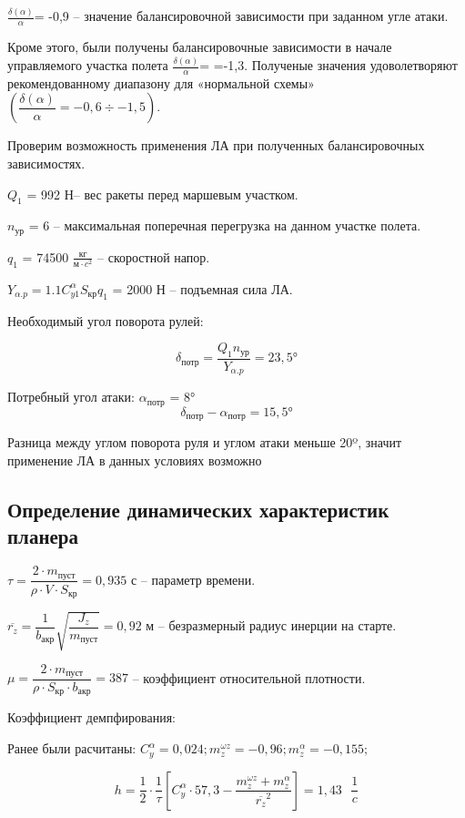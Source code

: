 $ \frac{\delta(\alpha)}{\alpha} $= -0,9 – значение балансировочной зависимости при заданном угле атаки.

Кроме этого, были получены балансировочные зависимости в начале управляемого участка полета  $\frac{\delta(\alpha)}{\alpha}$= =-1,3. Полученые значения удоволетворяют рекомендованному диапазону для «нормальной схемы» $\left( \dfrac{\delta(\alpha)}{\alpha}=-0,6 \div -1,5 \right) $.

Проверим возможность применения ЛА при полученных балансировочных зависимостях.

$Q_1 $ = 992 Н– вес ракеты перед маршевым участком.

$n_\text{ур}$ = 6 – максимальная поперечная перегрузка на данном участке полета.

$q_1$ = 74500  $\frac{\text{кг}}{м \cdot c^2} $ – скоростной напор.

$Y_{\alpha.p}=1.1 C_{y1}^\alpha S_\text{кр} q_1 $ = 2000 Н – подъемная сила ЛА.

Необходимый угол поворота рулей:

$$\delta_\text{потр} = \dfrac{Q_1 n_\text{ур}}{Y_{\alpha.p}} = 23,5\text{°}$$

Потребный угол атаки: $\alpha_\text{потр} $ = 8°
$$\delta_\text{потр}-\alpha_\text{потр} = 15,5\text{°}$$

Разница между углом поворота руля и углом атаки меньше 20º, значит применение ЛА в данных условиях возможно

\clearpage
\subsection{Определение динамических характеристик планера}

$\tau= \dfrac {2 \cdot m_\text{пуст}} {\rho \cdot V \cdot S_\text{кр} }  = 0,935$ с – параметр времени.

$\overline{r_z} = \dfrac{1}{b_\text{акр}}  \sqrt{\dfrac{J_z} {m_\text{пуст}}}  = 0,92 $  м – безразмерный радиус инерции на старте.

$\mu= \dfrac{ 2 \cdot m_\text{пуст}} {\rho \cdot S_\text{кр} \cdot b_\text{акр} }  = 387$ – коэффициент относительной плотности.

Коэффициент демпфирования:

Ранее были расчитаны: $C_y^\alpha=0,024; m_z^{\omega z} = -0,96; m_z^\alpha = -0,155;$

$$h= \dfrac{1}{2} \cdot \dfrac{1}{\tau} \left[C_y^\alpha \cdot 57,3- \dfrac{m_z^{\omega z}+m_z^\alpha} {\overline{r_z}^2} \right]=1,43 \text{ }  \dfrac{1}{c} $$

